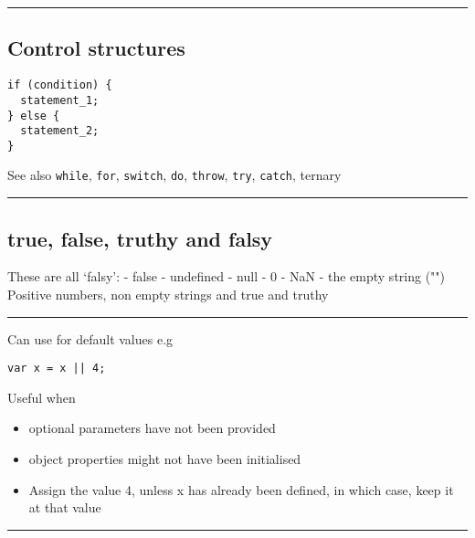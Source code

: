 \documentclass{article}[18pt]
\providecommand{\tightlist}{%
  \setlength{\itemsep}{0pt}\setlength{\parskip}{0pt}}
\begin{document}
\begin{center}\rule{0.5\linewidth}{\linethickness}\end{center}

\hypertarget{control-structures}{%
\subsection{Control structures}\label{control-structures}}

\begin{verbatim}
if (condition) {
  statement_1;
} else {
  statement_2;
}
\end{verbatim}

See also \texttt{while}, \texttt{for}, \texttt{switch}, \texttt{do},
\texttt{throw}, \texttt{try}, \texttt{catch}, ternary

\begin{center}\rule{0.5\linewidth}{\linethickness}\end{center}

\hypertarget{true-false-truthy-and-falsy}{%
\subsection{true, false, truthy and
falsy}\label{true-false-truthy-and-falsy}}

These are all `falsy': - false - undefined - null - 0 - NaN - the empty
string ("")\\
Positive numbers, non empty strings and true and truthy

\begin{center}\rule{0.5\linewidth}{\linethickness}\end{center}

Can use for default values e.g

\begin{verbatim}
var x = x || 4;
\end{verbatim}

Useful when

\begin{itemize}
\tightlist
\item
  optional parameters have not been provided
\item
  object properties might not have been initialised
  \item Assign the value 4, unless x has already been defined, in which case, keep it at that value
\end{itemize}

\begin{center}\rule{0.5\linewidth}{\linethickness}\end{center}
\end{document}
